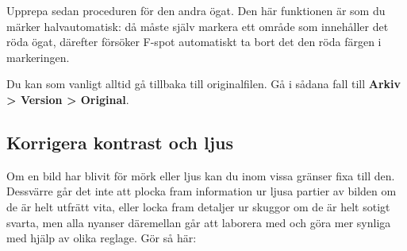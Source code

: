 \documentclass[a4paper,final]{memoir} %
\begin{document}
Upprepa sedan proceduren för den andra ögat. Den här funktionen är som du märker halvautomatisk: då måste själv markera ett område som innehåller det röda ögat, därefter försöker F-spot automatiskt ta bort det den röda färgen i markeringen.

Du kan som vanligt alltid gå tillbaka till originalfilen. Gå i sådana fall till \textbf{Arkiv \textgreater{} Version \textgreater{} Original}.


\subsection{Korrigera kontrast och ljus}


Om en bild har blivit för mörk eller ljus kan du inom vissa gränser fixa till den. Dessvärre går det inte att plocka fram information ur ljusa partier av bilden om de är helt utfrätt vita, eller locka fram detaljer ur skuggor om de är helt sotigt svarta, men alla nyanser däremellan går att laborera med och göra mer synliga med hjälp av olika reglage. Gör så här:
\end{document}
